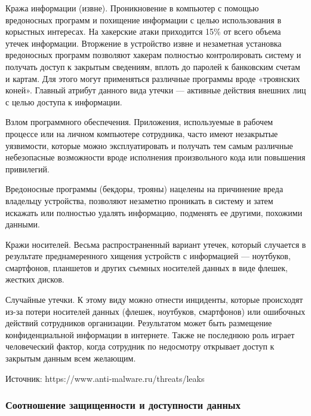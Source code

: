 Кража информации (извне). Проникновение в компьютер с помощью вредоносных программ и похищение информации с целью использования в корыстных интересах. На хакерские атаки приходится 15\% от всего объема утечек информации. Вторжение в устройство извне и незаметная установка вредоносных программ позволяют хакерам полностью контролировать систему и получать доступ к закрытым сведениям, вплоть до паролей к банковским счетам и картам. Для этого могут применяться различные программы вроде «троянских коней». Главный атрибут данного вида утечки — активные действия внешних лиц с целью доступа к информации.

Взлом программного обеспечения. Приложения, используемые в рабочем процессе или на личном компьютере сотрудника, часто имеют незакрытые уязвимости, которые можно эксплуатировать и получать тем самым различные небезопасные возможности вроде исполнения произвольного кода или повышения привилегий.

Вредоносные программы (бекдоры, трояны) нацелены на причинение вреда владельцу устройства, позволяют незаметно проникать в систему и затем искажать или полностью удалять информацию, подменять ее другими,  похожими данными.

Кражи носителей. Весьма распространенный вариант утечек, который случается в результате преднамеренного хищения устройств с информацией — ноутбуков, смартфонов, планшетов и других съемных носителей данных в виде флешек, жестких дисков.

Случайные утечки. К этому виду можно отнести инциденты, которые происходят из-за потери носителей данных (флешек, ноутбуков, смартфонов) или ошибочных действий сотрудников организации. Результатом может быть размещение конфиденциальной информации в интернете. Также не последнюю роль играет человеческий фактор, когда сотрудник по недосмотру открывает доступ к закрытым данным всем желающим.

Источник: https://www.anti-malware.ru/threats/leaks

\subsubsection{Соотношение защищенности и
доступности данных}

